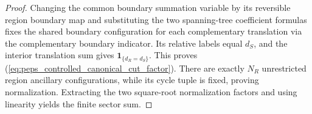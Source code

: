 \begin{proof}\leanok
    Changing the common boundary summation variable by its
    reversible region boundary map and substituting the two
    spanning-tree coefficient formulas fixes the
    shared boundary configuration for each complementary translation via the complementary boundary indicator. Its relative labels equal $d_S$,
    and the interior translation sum gives
    $\mathbf 1_{\{d_R=d_S\}}$. This proves
    (\ref{eq:peps_controlled_canonical_cut_factor}). There are exactly
    $N_R$ unrestricted region ancillary configurations, while its
    cycle tuple is fixed, proving normalization. Extracting the two
    square-root normalization factors and using linearity yields the
    finite sector sum.
\end{proof}

